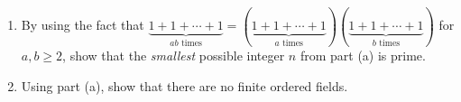\documentclass[12pt, letterpaper]{article}
\newcommand{\0}{\mathbf{0}}
\newcommand{\1}{\mathbf{1}}
\begin{document}
\begin{enumerate}
\begin{enumerate}
        \item 
        By using the fact that $\underbrace{1 + 1 + \cdots + 1}_{ab \text{ times}} = (\underbrace{1 + 1 + \cdots + 1}_{a \text{ times}})(\underbrace{1 + 1 + \cdots + 1}_{b \text{ times}})$ for $a, b \geq 2$, show that the \textit{smallest} possible integer $n$ from part (a) is prime.\\

        \item 
        Using part (a), show that there are no finite ordered fields.
        
    \end{enumerate}
    
    
\end{enumerate}
\end{document}
